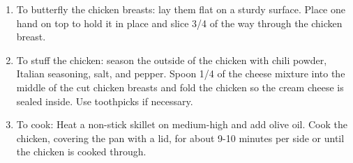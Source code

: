 \documentclass[11pt, twoside, openany]{book}
\begin{document}
\begin{minipage}[t]{\linewidth}
\begin{enumerate}
\item To butterfly the chicken breasts: lay them flat on a sturdy surface. Place one hand on top to hold it in place and slice 3/4 of the way through the chicken breast.
\item To stuff the chicken: season the outside of the chicken with chili powder, Italian seasoning, salt, and pepper. Spoon 1/4 of the cheese mixture into the middle of the cut chicken breasts and fold the chicken so the cream cheese is sealed inside. Use toothpicks if necessary.
\item To cook: Heat a non-stick skillet on medium-high and add olive oil. Cook the chicken, covering the pan with a lid, for about 9-10 minutes per side or until the chicken is cooked through.
\end{enumerate}
\end{minipage}\vspace{8mm}
\end{document}
